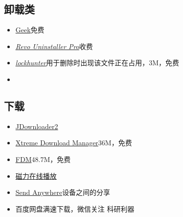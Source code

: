 \documentclass[UTF8,oneside]{ctexbook}
\begin{document}
\subsection{卸载类}
\begin{itemize}
	\item \href{https://geekuninstaller.com}{Geek}\quad 免费
	\item \underline{\textit{\href{https://www.revouninstaller.com/}{Revo Uninstaller Pro}}}\quad 收费
	\item \underline{\textit{\href{https://lockhunter.com}{lockhunter}}}\quad 用于删除时出现该文件正在占用，3M，免费
	\item
\end{itemize}

\subsection{下载}
\begin{itemize}
	\item \href{http://jdownloader.org/jdownloader2}{JDownloader2}
	\item \href{http://xdman.sourceforge.net}{Xtreme Download Manager}\quad 36M，免费
	\item \href{https://www.freedownloadmanager.org/}{FDM}\quad 48.7M，免费
	\item \href{https://webtorrent.io}{磁力在线播放}
	\item \href{https://send-anywhere.com}{Send Anywhere}\quad 设备之间的分享
	\item 百度网盘满速下载，微信关注 科研利器
\end{itemize}
\end{document}
